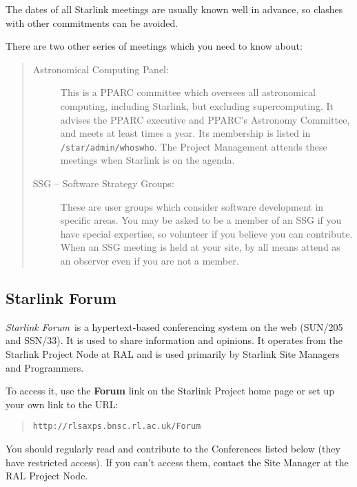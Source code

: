 \documentclass[twoside,11pt]{article}
\newcommand{\htmladdnormallink}[2]{#1}
\newcommand{\xref}[3]{#1}
\begin{document}
The dates of all Starlink meetings are usually known well in advance, so clashes
with other commitments can be avoided.

There are two other series of meetings which you need to know about:

\begin{quote}
\begin{description}

\item [Astronomical Computing Panel:]
This is a PPARC committee which oversees all astronomical computing,
including Starlink, but excluding supercomputing.
It advises the PPARC executive and PPARC's Astronomy Committee, and meets at
least times a year.
Its membership is listed in {\tt /star/admin/whoswho}.
The Project Management attends these meetings when Starlink is on the agenda.

\item [SSG -- Software Strategy Groups:]
These are user groups which consider software development in specific areas.
You may be asked to be a member of an SSG if you have special expertise,
so volunteer if you believe you can contribute.
When an SSG meeting is held at your site, by all means attend as an observer
even if you are not a member.

\end{description}
\end{quote}

\subsection {Starlink Forum}

{\em Starlink Forum}\, is a hypertext-based conferencing system on the web
(\xref{SUN/205}{sun205}{} and
\xref{SSN/33}{ssn33}{}).
It is used to share information and opinions.
It operates from the Starlink Project Node at RAL and is used primarily by
Starlink Site Managers and Programmers.

To access it, use the
\htmladdnormallink{{\bf Forum}}{http://rlsaxps.bnsc.rl.ac.uk/Forum}
link on the Starlink Project home page or set
up your own link to the URL:
\begin{quote}
{\tt http://rlsaxps.bnsc.rl.ac.uk/Forum}
\end{quote}
You should regularly read and contribute to the Conferences listed below
(they have restricted access).
If you can't access them, contact the Site Manager at the RAL Project Node.
\end{document}

